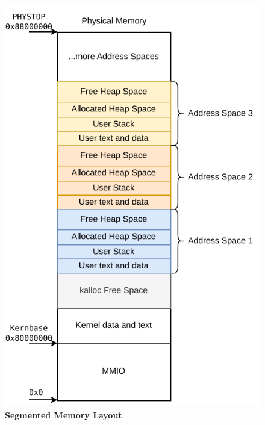 
\begin{figure}[ht!]
    \centering
    \includegraphics[]{figures/segmented_layout.pdf}
    \caption[Segmented Memory Layout]{\textbf{Segmented Memory Layout}}
    \label{fig:theory:segLayout}
\end{figure}


